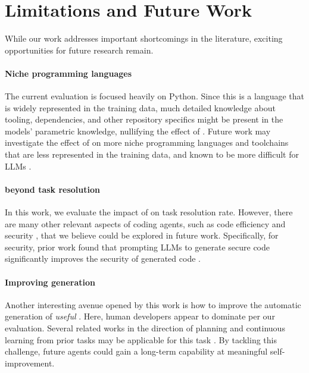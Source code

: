 \section{Limitations and Future Work}
\label{sec:future-work}
While our work addresses important shortcomings in the literature, exciting opportunities for future research remain.

\paragraph{Niche programming languages}
The current evaluation is focused heavily on Python. Since this is a language that is widely represented in the training data, much detailed knowledge about tooling, dependencies, and other repository specifics might be present in the models' parametric knowledge, nullifying the effect of \agentsmds{}. Future work may investigate the effect of \agentsmds{} on more niche programming languages and toolchains that are less represented in the training data, and known to be more difficult for LLMs \citep{cassano2022multiplescalableextensibleapproach,pmlr-v202-orlanski23a}.

\paragraph{\Agentsmds{} beyond task resolution} In this work, we evaluate the impact of \agentsmds{} on task resolution rate. However, there are many other relevant aspects of coding agents, such as code efficiency \citep{he2025sweperflanguagemodelsoptimize} and security \citep{chen2025secureagentbenchbenchmarkingsecurecode}, that we believe could be explored in future work. Specifically, for security, prior work found that prompting LLMs to generate secure code significantly improves the security of generated code \citep{baxbench}.

\paragraph{Improving \agentsmd{} generation} Another interesting avenue opened by this work is how to improve the automatic generation of \emph{useful} \agentsmds{}. Here, human developers appear to dominate per our evaluation. Several related works in the direction of planning and continuous learning from prior tasks may be applicable for this task \citep{suzgun2025dynamiccheatsheettesttimelearning,zhang2025agenticcontextengineeringevolving,cheng2025evocurrselfevolvingcurriculumbehavior}. By tackling this challenge, future agents could gain a long-term capability at meaningful self-improvement.


